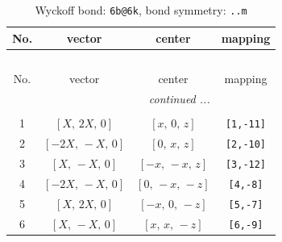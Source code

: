 \documentclass[fleqn,8pt]{jsarticle}
\begin{document}
\begin{longtable}{cccc}
\caption{Wyckoff bond: {\tt 6b@6k}, bond symmetry: {\tt ..m}}
 \\
 \hline \hline
No. & vector & center & mapping \\ \hline \endfirsthead

\multicolumn{3}{l}{\tablename\ \thetable{}} \\
 \hline \hline
No. & vector & center & mapping \\ \hline \endhead

 \hline \hline
\multicolumn{3}{r}{\footnotesize\it continued ...} \\ \endfoot

 \hline \hline
\multicolumn{3}{r}{} \\ \endlastfoot

1 & $\left[ X,\, 2 X,\, 0 \right]$ & $\left[ x,\, 0,\, z \right]$ & {\tt [1,-11]} \\ \hline
2 & $\left[ - 2 X,\, - X,\, 0 \right]$ & $\left[ 0,\, x,\, z \right]$ & {\tt [2,-10]} \\ \hline
3 & $\left[ X,\, - X,\, 0 \right]$ & $\left[ - x,\, - x,\, z \right]$ & {\tt [3,-12]} \\ \hline
4 & $\left[ - 2 X,\, - X,\, 0 \right]$ & $\left[ 0,\, - x,\, - z \right]$ & {\tt [4,-8]} \\ \hline
5 & $\left[ X,\, 2 X,\, 0 \right]$ & $\left[ - x,\, 0,\, - z \right]$ & {\tt [5,-7]} \\ \hline
6 & $\left[ X,\, - X,\, 0 \right]$ & $\left[ x,\, x,\, - z \right]$ & {\tt [6,-9]} \\
\end{longtable}
\renewcommand{\arraystretch}{1.2}
\end{document}
